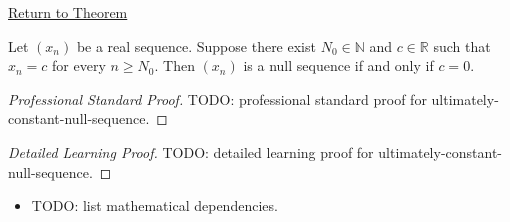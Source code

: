 \newpage
{}
\label{prf:ultimately-constant-null-sequence}

\begin{remark*}[Return]
\hyperref[thm:ultimately-constant-null-sequence]{Return to Theorem}
\end{remark*}

\begin{theorem*}
Let $(x_n)$ be a real sequence. Suppose there exist $N_0 \in \mathbb{N}$
and $c \in \mathbb{R}$ such that $x_n = c$ for every $n \ge N_0$. Then
$(x_n)$ is a null sequence if and only if $c = 0$.

\smallskip
\noindent
\end{theorem*}

\begin{proof}[Professional Standard Proof]
\LRAProofBodyStart
TODO: professional standard proof for ultimately-constant-null-sequence.
\end{proof}

\begin{proof}[Detailed Learning Proof]
\LRAProofBodyStart
TODO: detailed learning proof for ultimately-constant-null-sequence.
\end{proof}

\begin{remark*}
\end{remark*}

\begin{dependencies}
\begin{itemize}
  \item TODO: list mathematical dependencies.
\end{itemize}
\end{dependencies}

\clearpage
